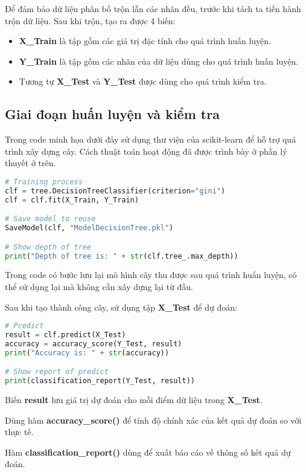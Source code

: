 \documentclass[../main-report.tex]{subfiles}
\begin{document}
Để đảm bảo dữ liệu phân bố trộn lẫn các nhãn đều, trước khi tách ta tiến hành trộn dữ liệu. Sau khi trộn, tạo ra được 4 biến:

\begin{itemize}
\item \textbf{X\_Train} là tập gồm các giá trị đặc tính cho quá trình huấn luyện.
\item \textbf{Y\_Train} là tập gồm các nhãn của dữ liệu dùng cho quá trình huấn luyện.
\item Tương tự \textbf{X\_Test} và \textbf{Y\_Test} được dùng cho quá trình kiểm tra.
\end{itemize}

\subsection{Giai đoạn huấn luyện và kiểm tra}
Trong code minh họa dưới đây sử dụng thư viện của scikit-learn để hỗ trợ quá trình xây dựng cây. Cách thuật toán hoạt động đã được trình bày ở phần lý thuyết ở trên.

\begin{lstlisting}[language=Python]
# Training process
clf = tree.DecisionTreeClassifier(criterion="gini")
clf = clf.fit(X_Train, Y_Train)

# Save model to reuse
SaveModel(clf, "ModelDecisionTree.pkl")

# Show depth of tree
print("Depth of tree is: " + str(clf.tree_.max_depth))
\end{lstlisting}

Trong code có bước lưu lại mô hình cây thu được sau quá trình huấn luyện, có thể sử dụng lại mà không cần xây dựng lại từ đầu.

Sau khi tạo thành công cây, sử dụng tập \textbf{X\_Test} để dự đoán:

\begin{lstlisting}[language=Python]
# Predict
result = clf.predict(X_Test)
accuracy = accuracy_score(Y_Test, result)
print("Accuracy is: " + str(accuracy))

# Show report of predict
print(classification_report(Y_Test, result))
\end{lstlisting}

Biến \textbf{result} lưu giá trị dự đoán cho mỗi điểm dữ liệu trong \textbf{X\_Test}.

Dùng hàm \textbf{accuracy\_score()} để tính độ chính xác của kết quả dự đoán so với thực tế.

Hàm \textbf{classification\_report()} dùng để xuất báo cáo về thông số kết quả dự đoán. 
\end{document}
